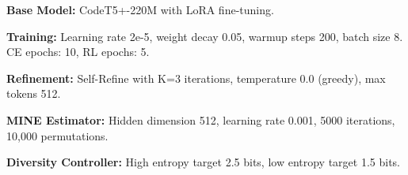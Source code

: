 
\textbf{Base Model:} CodeT5+-220M \citep{wang2023codet5plus} with LoRA \citep{hu2022lora} fine-tuning.

\textbf{Training:} Learning rate 2e-5, weight decay 0.05, warmup steps 200, batch size 8. CE epochs: 10, RL epochs: 5.

\textbf{Refinement:} Self-Refine \citep{madaan2023selfrefine} with K=3 iterations, temperature 0.0 (greedy), max tokens 512.

\textbf{MINE Estimator:} Hidden dimension 512, learning rate 0.001, 5000 iterations, 10,000 permutations.

\textbf{Diversity Controller:} High entropy target 2.5 bits, low entropy target 1.5 bits.


